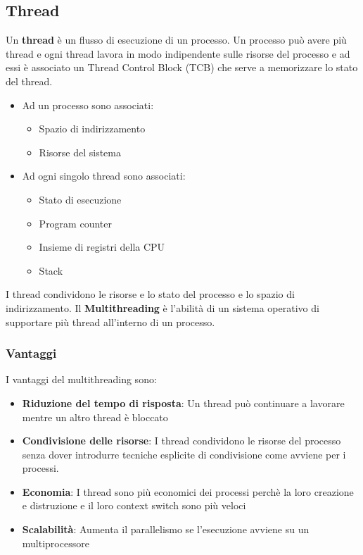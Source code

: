 \documentclass[a4paper]{article}
\begin{document}
\subsection{Thread}
Un \textbf{thread} è un flusso di esecuzione di un processo. Un processo può avere più
thread e ogni thread lavora in modo indipendente sulle risorse del processo e ad essi
è associato un Thread Control Block (TCB) che serve a memorizzare lo stato del thread.
\begin{itemize}
  \item Ad un processo sono associati:
    \begin{itemize}
      \item Spazio di indirizzamento
      \item Risorse del sistema
    \end{itemize}

  \item Ad ogni singolo thread sono associati:
    \begin{itemize}
      \item Stato di esecuzione
      \item Program counter
      \item Insieme di registri della CPU
      \item Stack
    \end{itemize}
\end{itemize}
I thread condividono le risorse e lo stato del processo e lo spazio di indirizzamento.
Il \textbf{Multithreading} è l'abilità di un sistema operativo di supportare più thread
all'interno di un processo.

\subsubsection{Vantaggi}
I vantaggi del multithreading sono:
\begin{itemize}
  \item \textbf{Riduzione del tempo di risposta}: Un thread può continuare a lavorare
    mentre un altro thread è bloccato
  \item \textbf{Condivisione delle risorse}: I thread condividono le risorse del processo
    senza dover introdurre tecniche esplicite di condivisione come avviene per i processi.
  \item \textbf{Economia}: I thread sono più economici dei processi perchè la loro creazione
    e distruzione e il loro context switch sono più veloci
  \item \textbf{Scalabilità}: Aumenta il parallelismo se l'esecuzione avviene su un
    multiprocessore 
\end{itemize}
\end{document}
